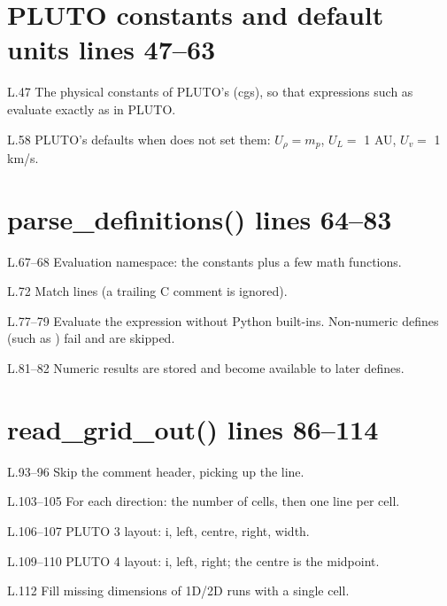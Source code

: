 \section*{\normalsize PLUTO constants and default units \hfill{\small\mdseries\color{gray}lines 47--63}}

\begin{lines}
\item[L.47] The physical constants of PLUTO's  (cgs), so that  expressions such as  evaluate exactly as in PLUTO.
\item[L.58] PLUTO's defaults when  does not set them: $U_\rho=m_p$, $U_L=$ 1 AU, $U_v=$ 1 km/s.
\end{lines}
\section*{\normalsize parse\_definitions() \hfill{\small\mdseries\color{gray}lines 64--83}}

\begin{lines}
\item[L.67–68] Evaluation namespace: the constants plus a few math functions.
\item[L.72] Match  lines (a trailing C comment is ignored).
\item[L.77–79] Evaluate the expression without Python built-ins. Non-numeric defines (such as ) fail and are skipped.
\item[L.81–82] Numeric results are stored and become available to later defines.
\end{lines}
\section*{\normalsize read\_grid\_out() \hfill{\small\mdseries\color{gray}lines 86--114}}

\begin{lines}
\item[L.93–96] Skip the comment header, picking up the  line.
\item[L.103–105] For each direction: the number of cells, then one line per cell.
\item[L.106–107] PLUTO 3 layout: i, left, centre, right, width.
\item[L.109–110] PLUTO 4 layout: i, left, right; the centre is the midpoint.
\item[L.112] Fill missing dimensions of 1D/2D runs with a single cell.
\end{lines}
